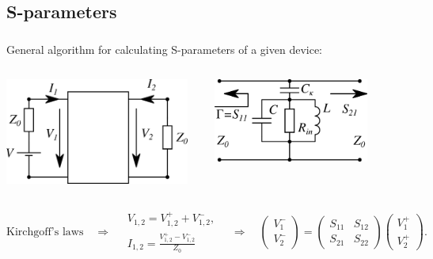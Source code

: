 \documentclass[aspectratio=169, 13pt]{beamer}
\newcommand{\rbrkt}[1]{\left( #1 \right)}
\begin{document}
\subsection{S-parameters}
\begin{frame}[c]\frametitle{\secname}\framesubtitle{\subsecname}
General algorithm for calculating S-parameters of a given device:

\vspace{0.5cm}
\begin{columns}[c]
\centering

\includegraphics[width=0.95\textwidth]{tl_scheme_general}
\centering

\vspace{0.35cm}
\includegraphics[width=0.8\textwidth]{tl_scheme}
\end{columns}

\begin{equation*}
\text{Kirchgoff's laws}\quad \Rightarrow \quad
\begin{gathered}
V_{1,2} = V_{1,2}^+ + V_{1,2}^- ,\\
I_{1,2} = \frac{ V_{1,2}^+ - V_{1,2}^- }{Z_0}
\end{gathered} \quad \Rightarrow \quad
\rbrkt{\begin{matrix}
V_1^- \\
V_2^-
\end{matrix}} = 
\rbrkt{\begin{matrix}
S_{11} & S_{12} \\
S_{21} & S_{22}
\end{matrix}}
\rbrkt{\begin{matrix}
V_1^+ \\
V_2^+
\end{matrix}}.
\end{equation*}

\end{frame}
\end{document}
